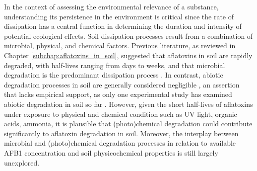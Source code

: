 In the context of assessing the environmental relevance of a substance, understanding its persistence in the environment is critical since the rate of dissipation has a central function in determining the duration and intensity of potential ecological effects.  Soil dissipation processes result from a combination of microbial, physical, and chemical factors. Previous literature, as reviewed in Chapter \ref{subchap:aflatoxins_in_soil}, suggested that aflatoxins in soil are rapidly degraded, with half-lives ranging from days to weeks, and that microbial degradation is the predominant dissipation process \citep{accinelli2008aspergillus, angle1980decomposition, angle1986aflatoxin}. In contrast, abiotic degradation processes in soil are generally considered negligible \citep{fouche2020aflatoxins}, an assertion that lacks empirical support, as only one experimental study has examined abiotic degradation in soil so far \citep{accinelli2008aspergillus}. However, given the short half-lives of aflatoxins under exposure to physical and chemical condition such as UV light, organic acids, ammonia, it is plausible that (photo)chemical degradation could contribute significantly to aflatoxin degradation in soil. Moreover, the interplay between microbial and (photo)chemical degradation processes in relation to available AFB1 concentration and soil physicochemical properties is still largely unexplored.


